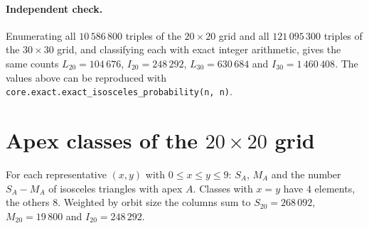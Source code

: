 \documentclass[11pt,a4paper]{article}
\theoremstyle{remark}
\begin{document}
\paragraph{Independent check.} Enumerating all $10\,586\,800$ triples of the
$20\times20$ grid and all $121\,095\,300$ triples of the $30\times30$ grid, and
classifying each with exact integer arithmetic, gives the same counts
$L_{20}=104\,676$, $I_{20}=248\,292$, $L_{30}=630\,684$ and $I_{30}=1\,460\,408$.
The values above can be reproduced with
\texttt{core.exact.exact\_isosceles\_probability(n, n)}.

\appendix

\section{Apex classes of the $20\times20$ grid}\label{app:20}

For each representative $(x,y)$ with $0\le x\le y\le9$: $S_A$, $M_A$ and the number
$S_A-M_A$ of isosceles triangles with apex $A$. Classes with $x=y$ have $4$
elements, the others $8$. Weighted by orbit size the columns sum to
$S_{20}=268\,092$, $M_{20}=19\,800$ and $I_{20}=248\,292$.
\end{document}
